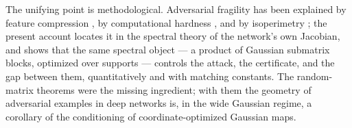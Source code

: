 The unifying point is methodological. Adversarial fragility has been explained by feature compression
\cite{fawzi18}, by computational hardness \cite{bubeckSS19}, and by isoperimetry
\cite{shafahi19,advExt}; the present account locates it in the spectral theory of the network's own
Jacobian, and shows that the same spectral object --- a product of Gaussian submatrix blocks, optimized
over supports --- controls the attack, the certificate, and the gap between them, quantitatively and with
matching constants. The random-matrix theorems were the missing ingredient; with them the geometry of
adversarial examples in deep networks is, in the wide Gaussian regime, a corollary of the conditioning
of coordinate-optimized Gaussian maps.
